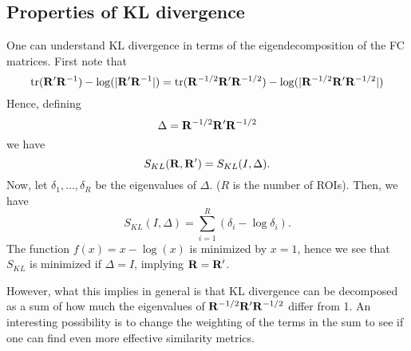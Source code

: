 \documentclass[12pt]{article}
\begin{document}
\subsection{Properties of KL divergence}

One can understand KL divergence in terms of the eigendecomposition of the FC matrices.
First note that
\[\text{tr}({\bf R'} {\bf R}^{-1}) - \log(|{\bf R'} {\bf R}^{-1}|)
= \text{tr}({\bf R}^{-1/2} {\bf R'} {\bf R}^{-1/2}) - \log(|{\bf R}^{-1/2}{\bf R'} {\bf R}^{-1/2}|)
\]
Hence, defining
\[
\Delta = {\bf R}^{-1/2} {\bf R'} {\bf R}^{-1/2}
\]
we have
\[
S_{KL}({\bf R}, {\bf R'}) = S_{KL}(I, \Delta).
\]
Now, let $\delta_1,\hdots, \delta_R$ be the eigenvalues of $\Delta$.  ($R$ is the number of ROIs).
Then, we have
\[
S_{KL}(I, \Delta) = \sum_{i=1}^R (\delta_i - \log \delta_i).
\]
The function $f(x) = x - \log(x)$ is minimized by $x=1$, hence we see that $S_{KL}$ is minimized if $\Delta = I$, implying ${\bf R} = {\bf R}'$.

However, what this implies in general is that KL divergence can be decomposed as a sum of how much the eigenvalues of ${\bf R}^{-1/2} {\bf R'} {\bf R}^{-1/2}$ differ from 1.  An interesting possibility is to change the weighting of the terms in the sum to see if one can find even more effective similarity metrics.
\end{document}
